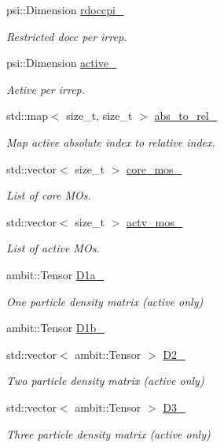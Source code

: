 \begin{DoxyCompactItemize}
psi\+::\+Dimension \mbox{\hyperlink{classforte_1_1_v2_r_d_m_a2a78e5ea658944a173f7852a0434d6ff}{rdoccpi\+\_\+}}
\begin{DoxyCompactList}\small\item\em Restricted docc per irrep. \end{DoxyCompactList}\item 
psi\+::\+Dimension \mbox{\hyperlink{classforte_1_1_v2_r_d_m_a7d3b1f5167f0a3a4c8824e1215b875d4}{active\+\_\+}}
\begin{DoxyCompactList}\small\item\em Active per irrep. \end{DoxyCompactList}\item 
std\+::map$<$ size\+\_\+t, size\+\_\+t $>$ \mbox{\hyperlink{classforte_1_1_v2_r_d_m_a7c12267657e6f4736b8b4f74f90b6d59}{abs\+\_\+to\+\_\+rel\+\_\+}}
\begin{DoxyCompactList}\small\item\em Map active absolute index to relative index. \end{DoxyCompactList}\item 
std\+::vector$<$ size\+\_\+t $>$ \mbox{\hyperlink{classforte_1_1_v2_r_d_m_af80c8ffa690056ff5ca8f09317355875}{core\+\_\+mos\+\_\+}}
\begin{DoxyCompactList}\small\item\em List of core M\+Os. \end{DoxyCompactList}\item 
std\+::vector$<$ size\+\_\+t $>$ \mbox{\hyperlink{classforte_1_1_v2_r_d_m_aaf7ad19cea43a026559e3d6e78621d22}{actv\+\_\+mos\+\_\+}}
\begin{DoxyCompactList}\small\item\em List of active M\+Os. \end{DoxyCompactList}\item 
ambit\+::\+Tensor \mbox{\hyperlink{classforte_1_1_v2_r_d_m_a229ab18708b430c0294c61fdcb30b38a}{D1a\+\_\+}}
\begin{DoxyCompactList}\small\item\em One particle density matrix (active only) \end{DoxyCompactList}\item 
ambit\+::\+Tensor \mbox{\hyperlink{classforte_1_1_v2_r_d_m_a6ea78714029197eea398c8fde53e49fd}{D1b\+\_\+}}
\item 
std\+::vector$<$ ambit\+::\+Tensor $>$ \mbox{\hyperlink{classforte_1_1_v2_r_d_m_adebb45f1a9a9b54cdb498a8da9bfa8e1}{D2\+\_\+}}
\begin{DoxyCompactList}\small\item\em Two particle density matrix (active only) \end{DoxyCompactList}\item 
std\+::vector$<$ ambit\+::\+Tensor $>$ \mbox{\hyperlink{classforte_1_1_v2_r_d_m_a984cf7db5abf9b20cf6f921dcd88c324}{D3\+\_\+}}
\begin{DoxyCompactList}\small\item\em Three particle density matrix (active only) \end{DoxyCompactList}\end{DoxyCompactItemize}


